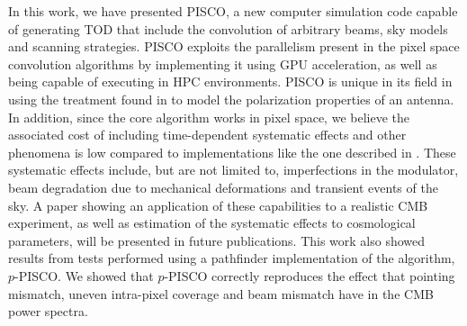 \documentclass[a4paper,11pt]{article}
\begin{document}
In this work, we have presented PISCO, a new computer simulation code capable of generating TOD that include the convolution of arbitrary beams, sky models and scanning strategies. PISCO exploits the parallelism present in the pixel space convolution algorithms by implementing it using GPU acceleration, as well as being capable of executing in HPC environments. PISCO is unique in its field in using the treatment found in \cite{2007MNRAS.376.1767O} to model the polarization properties of an antenna. In addition, since the core algorithm works in pixel space, we believe the associated cost of including time-dependent systematic effects and other phenomena is low compared to implementations like the one described in \cite{2018arXiv180905034D}. These systematic effects include, but are not limited to, imperfections in the modulator, beam degradation due to mechanical deformations and transient events of the sky. A paper showing an application of these capabilities to a realistic CMB experiment, as well as estimation of the systematic effects to cosmological parameters, will be presented in future publications. This work also showed results from tests performed using a pathfinder implementation of the algorithm, $p$-PISCO. We showed that $p$-PISCO correctly reproduces the effect that pointing mismatch, uneven intra-pixel coverage and beam mismatch have in the CMB power spectra. 




\appendix
\end{document}
